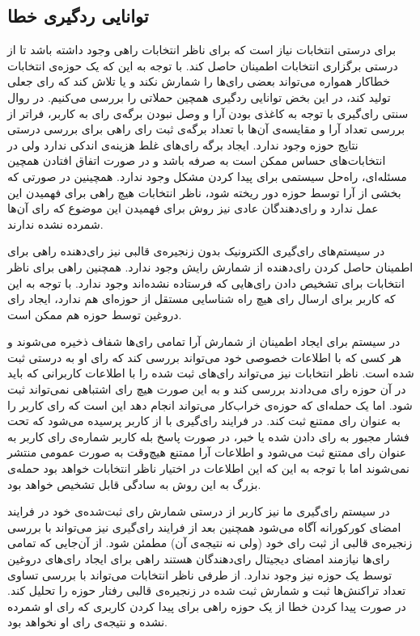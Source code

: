 \subsection{توانایی ردگیری خطا}
برای درستی انتخابات نیاز است که برای ناظر انتخابات راهی وجود داشته باشد تا از درستی برگزاری انتخابات اطمینان حاصل کند. با توجه به این که یک حوزه‌ی انتخابات خطاکار همواره می‌تواند بعضی رای‌ها را شمارش نکند و یا تلاش کند که رای جعلی تولید کند، در این بخض توانایی ردگیری همچین حملاتی را بررسی می‌کنیم.
در روال سنتی رای‌گیری با توجه به کاغذی بودن آرا و وصل نبودن برگه‌ی رای به کاربر، فراتر از بررسی تعداد آرا و مقایسه‌ی آن‌ها با تعداد برگه‌ی ثبت رای راهی برای بررسی درستی نتایج حوزه وجود ندارد. ایجاد برگه‌ رای‌های غلط هزینه‌ی اندکی ندارد ولی در انتخابات‌های حساس ممکن است به صرفه باشد و در صورت اتفاق افتادن همچین مسئله‌ای، راه‌حل سیستمی برای پیدا کردن مشکل وجود ندارد. همچینین در صورتی که بخشی از آرا توسط حوزه دور ریخته شود، ناظر انتخابات هیچ راهی برای فهمیدن این عمل ندارد و رای‌دهندگان عادی نیز روش برای فهمیدن این موضوع که رای آن‌ها شمرده نشده ندارند.
\par 
در سیستم‌های رای‌گیری الکترونیک بدون زنجیره‌ی قالبی نیز رای‌دهنده راهی برای اطمینان حاصل کردن رای‌‌دهنده از شمارش رایش وجود ندارد. همچنین راهی برای ناظر انتخابات برای تشخیص دادن رای‌هایی که فرستاده نشده‌اند وجود ندارد. با توجه به این که کاربر برای ارسال رای هیچ راه شناسایی مستقل از حوزه‌ای هم ندارد، ایجاد رای دروغین توسط حوزه هم ممکن است. 
\par 
در سیستم‌  برای ایجاد اطمینان از شمارش آرا تمامی رای‌ها شفاف ذخیره می‌شوند و هر کسی که با اطلاعات خصوصی خود می‌تواند بررسی کند که رای او به درستی ثبت شده است. ناظر انتخابات نیز می‌تواند رای‌های ثبت شده را با اطلاعات کاربرانی که باید در آن حوزه رای می‌دادند بررسی کند و به این صورت هیچ رای اشتباهی نمی‌تواند ثبت شود. اما یک حمله‌ای که حوزه‌ی خراب‌کار می‌تواند انجام دهد این است که رای کاربر را به عنوان رای ممتنع ثبت کند. در فرایند رای‌گیری با  از کاربر پرسیده می‌شود که تحت فشار مجبور به رای دادن شده یا خبر، در صورت پاسخ بله کاربر شماره‌ی رای کاربر به عنوان رای ممتنع ثبت می‌شود و اطلاعات آرا ممتنع هیچ‌وقت به صورت عمومی منتشر نمی‌شوند اما با توجه به این که این اطلاعات در اختیار ناظر انتخابات خواهد بود حمله‌‌ی بزرگ به این روش به سادگی قابل تشخیص خواهد بود. 
\par 
در سیستم رای‌گیری ما نیز کاربر از درستی شمارش رای‌ ثبت‌شده‌ی خود در فرایند امضای کورکورانه آگاه می‌شود همچنین بعد از فرایند رای‌گیری نیز می‌تواند با بررسی زنجیره‌ی قالبی از ثبت رای‌ خود (ولی نه نتیجه‌ی آن) مطمئن شود. از آن‌جایی که تمامی رای‌ها نیازمند امضای دیجیتال رای‌دهندگان هستند راهی برای ایجاد رای‌های دروغین توسط یک حوزه نیز وجود ندارد. از طرفی ناظر انتخابات می‌تواند با بررسی تساوی تعداد تراکنش‌ها ثبت و شمارش ثبت شده در زنجیره‌ی قالبی رفتار حوزه را تحلیل کند. در صورت پیدا کردن خطا از یک حوزه راهی برای پیدا کردن کاربری که رای او شمرده نشده و نتیجه‌ی رای او نخواهد بود.



